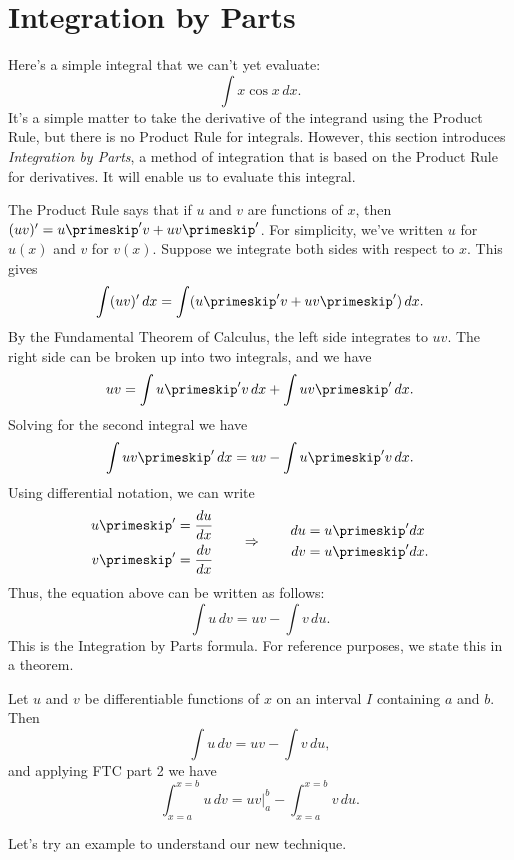 \section{Integration by Parts}\label{sec:IBP}

Here's a simple integral that we can't yet evaluate:
\[\int x\cos x \,dx.\]
It's a simple matter to take the derivative of the integrand using the Product Rule, but there is no Product Rule for integrals.  However, this section introduces \textit{Integration by Parts}, a method of integration that is based on the Product Rule for derivatives. It will enable us to evaluate this integral.

The Product Rule says that if $u$ and $v$ are functions of $x$, then  $(uv)' = u\primeskip'v + uv\primeskip'$.  For simplicity, we've written $u$ for $u(x)$ and $v$ for $v(x)$.  Suppose we integrate both sides with respect to $x$.  This gives
$$\int (uv)'\,dx = \int (u\primeskip'v+uv\primeskip')\,dx.$$
By the Fundamental Theorem of Calculus, the left side integrates to $uv$.  The right side can be broken up into two integrals, and we have
$$uv = \int u\primeskip'v\,dx + \int uv\primeskip'\,dx.$$
Solving for the second integral we have 
$$\int uv\primeskip'\,dx = uv - \int u\primeskip'v\,dx.$$
Using differential notation, we can write
\[
\begin{aligned}
 u\primeskip'&=\frac{du}{dx} \\
 v\primeskip'&=\frac{dv}{dx}
\end{aligned}
\qquad\Rightarrow\qquad
\begin{aligned}
 du&=u\primeskip'dx \\
 dv&=u\primeskip'dx.
\end{aligned}
\]
Thus, the equation above can be written as follows:
$$\int u\,dv = uv - \int v\,du.$$
This is the Integration by Parts formula. For reference purposes, we state this in a theorem.

{Let $u$ and $v$ be differentiable functions of $x$ on an interval $I$ containing $a$ and $b$. Then 
$$\int u\, dv = uv - \int v\, du,$$
and applying FTC part 2 we have 
$$\int_{x=a}^{x=b} u\, dv = uv\Big|_a^b - \int_{x=a}^{x=b}v\, du.$$}


Let's try an example to understand our new technique.

